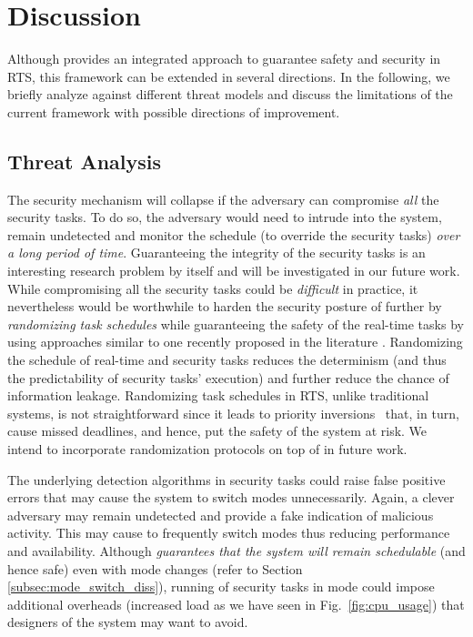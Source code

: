\documentclass[../rt_server_main.tex]{subfiles}
\begin{document}
\section{Discussion} \label{sec:discussion}

Although \coolname provides an integrated approach to guarantee safety and security in RTS, this framework can be extended in several directions. In the following, we briefly analyze \coolname against different threat models and discuss the limitations of the current framework with possible directions of improvement.

\subsection{Threat Analysis}

The security mechanism will collapse if the adversary can compromise \textit{all} the security tasks. To do so, the adversary would need to intrude into the system, remain undetected and monitor the schedule \cite{cy_side_channel} (to override the security tasks)  \textit{over a long period of time}. Guaranteeing the integrity of the security tasks is an interesting research problem by itself and will be investigated in our future work. While compromising all the security tasks could be \textit{difficult} in practice, it nevertheless would be worthwhile to harden the security posture of \coolname further by \textit{randomizing task schedules} while guaranteeing the safety of the real-time tasks by using approaches similar to one recently proposed in the literature \cite{taskshuffler}. Randomizing the schedule of real-time and security tasks reduces the determinism (and thus the predictability of security tasks' execution) and further reduce the chance of information leakage.  Randomizing task schedules in RTS, unlike traditional systems, is not straightforward since it leads to priority
inversions~\cite{Sha:1990:PIP} that, in turn, cause missed deadlines, and
hence, put the safety of the system at risk.  We intend to incorporate randomization protocols on top of \coolname in future work.


The underlying detection algorithms in security tasks could raise false positive errors that may cause the system to switch modes unnecessarily. Again, a clever adversary may remain undetected and provide a fake indication of malicious activity. This may cause \coolname to frequently switch modes thus reducing performance and availability. Although \coolname \textit{guarantees that the system will remain schedulable} (and hence safe) even with mode changes (refer to Section \ref{subsec:mode_switch_diss}), running of security tasks in \ave mode could impose additional overheads (\ie increased load as we have seen in Fig.~\ref{fig:cpu_usage}) that designers of the system may want to avoid. %
\end{document}
